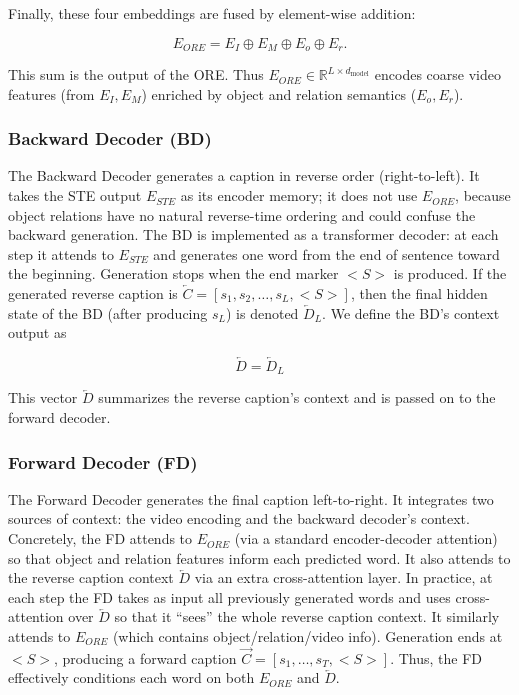 Finally, these four embeddings are fused by element-wise addition:

$$
E_{ORE} = E_I \oplus E_M \oplus E_o \oplus E_r.
$$

This sum is the output of the ORE. Thus $E_{ORE}\in\mathbb{R}^{L\times d_{\text{model}}}$ encodes coarse video features (from $E_I,E_M$) enriched by object and relation semantics ($E_o,E_r$).

\subsubsection{Backward Decoder (BD)}

The Backward Decoder generates a caption in reverse order (right-to-left). It takes the STE output $E_{STE}$ as its encoder memory; it does not use $E_{ORE}$, because object relations have no natural reverse-time ordering and could confuse the backward generation. The BD is implemented as a transformer decoder: at each step it attends to $E_{STE}$ and generates one word from the end of sentence toward the beginning. Generation stops when the end marker $<S>$ is produced. If the generated reverse caption is $\overleftarrow{C} = [s_1, s_2, \dots, s_L, <S>]$, then the final hidden state of the BD (after producing $s_L$) is denoted $\overleftarrow{D}_L$. We define the BD's context output as

$$
\overleftarrow{D} = \overleftarrow{D}_L
$$

This vector $\overleftarrow{D}$ summarizes the reverse caption's context and is passed on to the forward decoder.

\subsubsection{Forward Decoder (FD)}

The Forward Decoder generates the final caption left-to-right. It integrates two sources of context: the video encoding and the backward decoder's context. Concretely, the FD attends to $E_{ORE}$ (via a standard encoder-decoder attention) so that object and relation features inform each predicted word. It also attends to the reverse caption context $\overleftarrow{D}$ via an extra cross-attention layer. In practice, at each step the FD takes as input all previously generated words and uses cross-attention over $\overleftarrow{D}$ so that it ``sees'' the whole reverse caption context. It similarly attends to $E_{ORE}$ (which contains object/relation/video info). Generation ends at $<S>$, producing a forward caption $\overrightarrow{C}=[s_1,\dots,s_T,<S>]$. Thus, the FD effectively conditions each word on both $E_{ORE}$ and $\overleftarrow{D}$.

